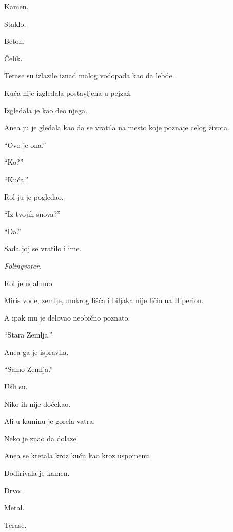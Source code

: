 Kamen.

Staklo.

Beton.

Čelik.

\bigskip

Terase su izlazile iznad malog vodopada kao da lebde.

Kuća nije izgledala postavljena u pejzaž.

Izgledala je kao deo njega.

\bigskip

Anea ju je gledala kao da se vratila na mesto koje poznaje celog života.

\bigskip

``Ovo je ona.''

``Ko?''

``Kuća.''

\bigskip

Rol ju je pogledao.

``Iz tvojih snova?''

``Da.''

\bigskip

Sada joj se vratilo i ime.

\emph{Folingvoter}.

\bigskip

Rol je udahnuo.

Miris vode, zemlje, mokrog lišća i biljaka nije ličio na Hiperion.

A ipak mu je delovao neobično poznato.

\bigskip

``Stara Zemlja.''

\bigskip

Anea ga je ispravila.

``Samo Zemlja.''

\bigskip

Ušli su.

\bigskip

Niko ih nije dočekao.

Ali u kaminu je gorela vatra.

\bigskip

Neko je znao da dolaze.

\bigskip

Anea se kretala kroz kuću kao kroz uspomenu.

Dodirivala je kamen.

Drvo.

Metal.

Terase.

\bigskip

